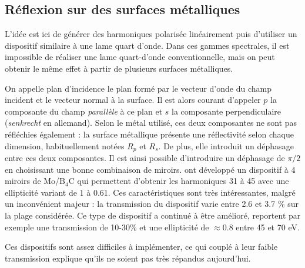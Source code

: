 \subsection{Réflexion sur des surfaces métalliques}
\label{sec:metalsurface}
L'idée est ici de générer des harmoniques polarisée linéairement puis d'utiliser un dispositif similaire à une lame quart d'onde. Dans ces gammes spectrales, il est impossible de réaliser une lame quart-d'onde conventionnelle, mais on peut obtenir le même effet à partir de plusieurs surfaces métalliques. \par
On appelle plan d'incidence le plan formé par le vecteur d'onde du champ incident et le vecteur normal à la surface. Il est alors courant d'appeler $p$ la composante du champ \textit{parallèle} à ce plan et $s$ la composante perpendiculaire (\textit{senkrecht} en allemand). Selon le métal utilisé, ces deux composantes ne sont pas réfléchies également : la surface métallique présente une réflectivité selon chaque dimension, habituellement notées $R_p$ et $R_s$. De plus, elle introduit un déphasage entre ces deux composantes. Il est ainsi possible d'introduire un déphasage de $\pi/2$ en choisissant une bonne combinaison de miroirs.  ont développé un dispositif à 4 miroirs de Mo/$\text{B}_\text{4}$C qui permettent d'obtenir les harmoniques 31 à 45 avec une ellipticité variant de 1 à 0.61. Ces caractéristiques sont très intéressantes, malgré un inconvénient majeur : la transmission du dispositif varie entre 2.6 et 3.7 \% sur la plage considérée. Ce type de dispositif a continué à être amélioré,  reportent par exemple une transmission de 10-30\% et une ellipticité de $\approx 0.8$ entre 45 et 70 eV.\par

Ces dispositifs sont assez difficiles à implémenter, ce qui couplé à leur faible transmission explique qu'ils ne soient pas très répandus aujourd'hui. 

